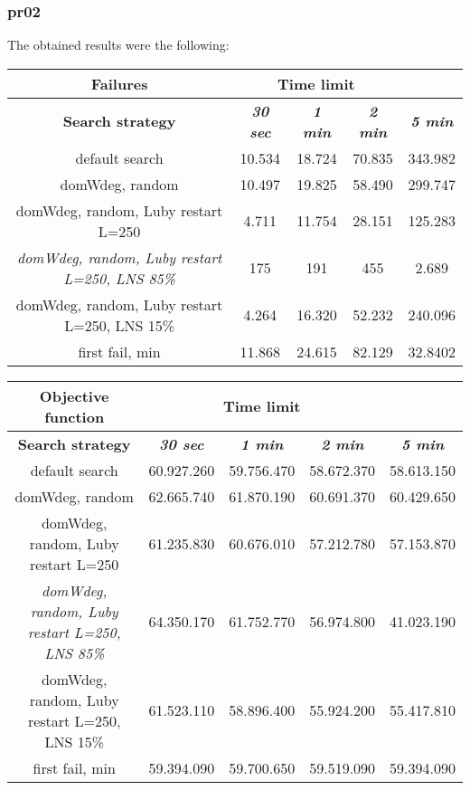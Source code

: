 \subsubsection{pr02}
The obtained results were the following:
{
\renewcommand{\arraystretch}{2}
\begin{longtable}[h]{| c | c | c | c | c |}
    \hline
    \textbf{Failures} & \multicolumn{3}{c}{Time limit} & \\
    \hline
    \textbf{Search strategy} & \textbf{\textit{30 sec}} & \textbf{\textit{1 min}} & \textbf{\textit{2 min}} & \textbf{\textit{5 min}} \\
    \hline
    \endhead
    default search                                         & 10.534 & 18.724 & 70.835 & 343.982 \\
    \hline
    domWdeg, random                                        & 10.497 & 19.825 & 58.490 & 299.747 \\
    \hline
    domWdeg, random, Luby restart L=250                    &  4.711 & 11.754 & 28.151 & 125.283 \\
    \hline
    \textit{domWdeg, random, Luby restart L=250, LNS 85\%} &   175 &   191 &   455 &   2.689 \\
    \hline
    domWdeg, random, Luby restart L=250, LNS 15\%          &  4.264 & 16.320 & 52.232 & 240.096 \\
    \hline
    first fail, min                                        & 11.868 & 24.615 & 82.129 & 32.8402 \\
    \hline
\end{longtable}
}

{
\renewcommand{\arraystretch}{2}
\begin{longtable}[h]{| c | c | c | c | c |}
    \hline
    \textbf{Objective function} & \multicolumn{3}{c}{Time limit} & \\
    \hline
    \textbf{Search strategy} & \textbf{\textit{30 sec}} & \textbf{\textit{1 min}} & \textbf{\textit{2 min}} & \textbf{\textit{5 min}} \\
    \hline
    \endhead
    default search                                         & 60.927.260 & 59.756.470 & 58.672.370 & 58.613.150 \\
    \hline
    domWdeg, random                                        & 62.665.740 & 61.870.190 & 60.691.370 & 60.429.650 \\
    \hline
    domWdeg, random, Luby restart L=250                    & 61.235.830 & 60.676.010 & 57.212.780 & 57.153.870 \\
    \hline
    \textit{domWdeg, random, Luby restart L=250, LNS 85\%} & 64.350.170 & 61.752.770 & 56.974.800 & 41.023.190 \\
    \hline
    domWdeg, random, Luby restart L=250, LNS 15\%          & 61.523.110 & 58.896.400 & 55.924.200 & 55.417.810 \\
    \hline
    first fail, min                                        & 59.394.090 & 59.700.650 & 59.519.090 & 59.394.090 \\
    \hline
\end{longtable}
}

